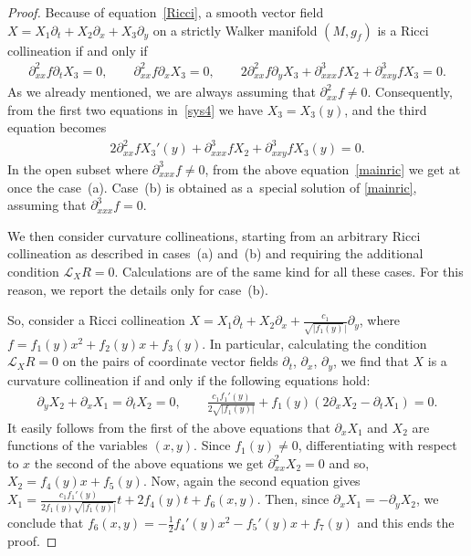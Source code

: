 \documentclass[pdftex]{sigma}
\numberwithin{equation}{section}
\begin{document}
\begin{proof}
Because of equation~\eqref{Ricci}, a smooth vector f\/ield $X=X_1\partial_t+X_2\partial_x+X_3\partial_y$ on a strictly Walker manifold $(M,g_f)$ is a Ricci collineation if and only if
\begin{gather}\label{sys4}
 \partial_{xx}^2f \partial_tX_3=0,\qquad \partial_{xx}^2f\partial_xX_3=0,\qquad
 2\partial_{xx}^2f\partial_yX_3+ \partial_{xxx}^3f X_2+ \partial_{xxy}^3f X_3=0.
\end{gather}
As we already mentioned, we are always assuming that $\partial_{xx}^2f\neq 0$. Consequently, from the f\/irst two equations in~\eqref{sys4} we have $X_3=X_3(y)$, and the third equation becomes
\begin{gather}\label{mainric}
2\partial_{xx}^2f X_3 '(y)+\partial_{xxx}^3f X_2+\partial_{xxy}^3f X_3(y)=0.
\end{gather}
In the open subset where $\partial_{xxx}^3f \neq 0$, from the above equation~\eqref{mainric} we get at once the case~(a). Case~(b) is obtained as a~special solution of \eqref{mainric}, assuming that $\partial_{xxx}^3f =0$.

We then consider curvature collineations, starting from an arbitrary Ricci collineation as described in cases~(a) and~(b) and requiring the additional condition $\mathcal{L}_X R=0$. Calculations are of the same kind for all these cases. For this reason, we report the details only for case~(b).

So, consider a Ricci collineation $X=X_1\partial_t+X_2\partial_x+\frac{c_1}{\sqrt{|f_1(y)}|}\partial_y$, where $f=f_1(y)x^2+f_2(y)x+f_3(y)$. In particular, calculating the condition $\mathcal{L}_X R=0$ on the pairs of coordinate vector f\/ields $\partial_t$, $\partial_x$, $\partial_y$, we f\/ind that $X$ is a curvature collineation if and only if the following equations hold:
\begin{gather*}
\partial_yX_2+\partial_xX_1=\partial_tX_2=0,\qquad \frac{c_1f_1 '(y)}{2\sqrt{|f_1(y)|}}+f_1(y)\left(2\partial_xX_2-\partial_tX_1\right)=0.
\end{gather*}
It easily follows from the f\/irst of the above equations that $\partial_xX_1$ and $X_2$ are functions of the variables $(x,y)$. Since $f_1(y)\neq 0$, dif\/ferentiating with respect to $x$ the second of the above equations we get $\partial_{xx}^2X_2=0$ and so, $X_2=f_4(y)x+f_5(y)$. Now, again the second equation gives $X_1=\frac{c_1f_1 '(y)}{2f_1(y)\sqrt{|f_1(y)}|}t+2f_4(y)t+f_6(x,y)$. Then, since $\partial_xX_1=-\partial_yX_2$, we conclude that $f_6(x,y)=-\frac12f_4 '(y) x^2-f_5 '(y) x+f_7(y)$ and this ends the proof.
\end{proof}
\end{document}
